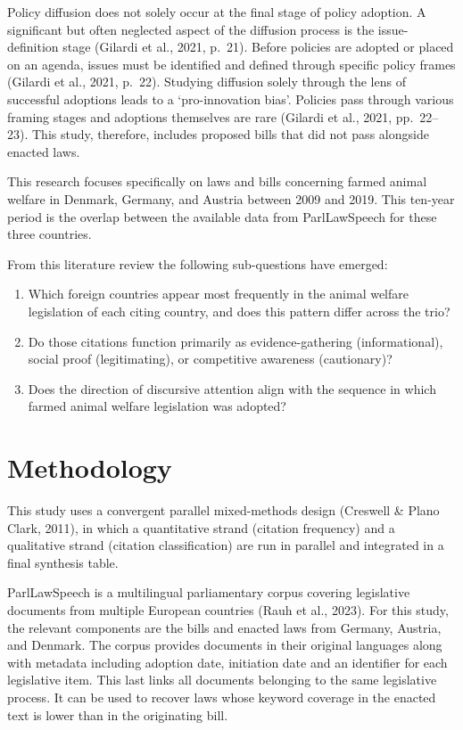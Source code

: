\documentclass[twocolumn, 10pt, a4paper]{article}
\begin{document}
Policy diffusion does not solely occur at the final stage of policy adoption. A
significant but often neglected aspect of the diffusion process is the issue-definition
stage (Gilardi et al., 2021, p.~21). Before policies are adopted or placed on an
agenda, issues must be identified and defined through specific policy frames (Gilardi
et al., 2021, p.~22). Studying diffusion solely through the lens of successful
adoptions leads to a `pro-innovation bias'. Policies pass through various framing
stages and adoptions themselves are rare (Gilardi et al., 2021, pp.~22--23). This
study, therefore, includes proposed bills that did not pass alongside enacted laws.

This research focuses specifically on laws and bills concerning farmed animal welfare
in Denmark, Germany, and Austria between 2009 and 2019. This ten-year period is the
overlap between the available data from ParlLawSpeech for these three countries.

\noindent From this literature review the following sub-questions have emerged:

\begin{enumerate}[leftmargin=*, topsep=2pt, itemsep=1pt]
  \item Which foreign countries appear most frequently in the animal welfare
        legislation of each citing country, and does this pattern differ across the
        trio?
  \item Do those citations function primarily as evidence-gathering (informational),
        social proof (legitimating), or competitive awareness (cautionary)?
  \item Does the direction of discursive attention align with the sequence in which
        farmed animal welfare legislation was adopted?
\end{enumerate}

\section{Methodology}

This study uses a convergent parallel mixed-methods design (Creswell \& Plano Clark,
2011), in which a quantitative strand (citation frequency) and a qualitative strand
(citation classification) are run in parallel and integrated in a final synthesis
table.

ParlLawSpeech is a multilingual parliamentary corpus covering legislative documents
from multiple European countries (Rauh et al., 2023). For this study, the relevant
components are the bills and enacted laws from Germany, Austria, and Denmark. The
corpus provides documents in their original languages along with metadata including
adoption date, initiation date and an identifier for each legislative item. This last
links all documents belonging to the same legislative process. It can be used to
recover laws whose keyword coverage in the enacted text is lower than in the
originating bill.
\end{document}

